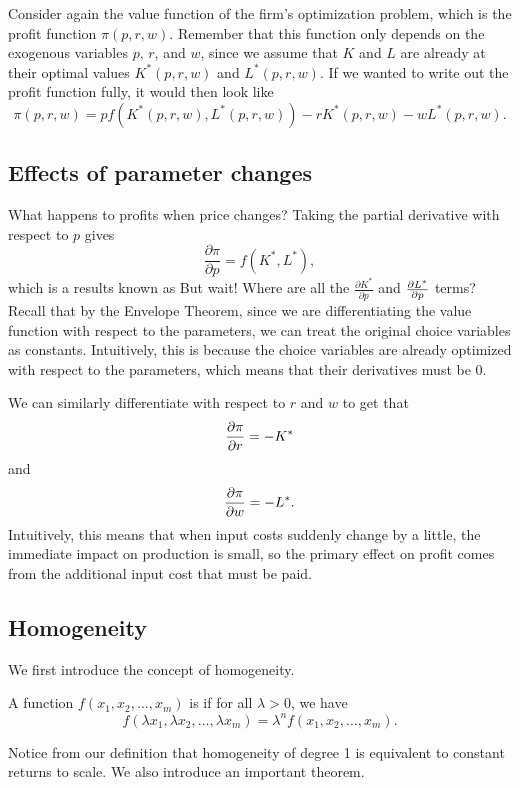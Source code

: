 Consider again the value function of the firm's optimization problem, which is the profit function $\pi(p, r, w)$. Remember that this function only depends on the exogenous variables $p$, $r$, and $w$, since we assume that $K$ and $L$ are already at their optimal values $K^*(p, r, w)$ and $L^*(p, r, w)$. If we wanted to write out the profit function fully, it would then look like
$$\pi(p, r, w) = pf(K^*(p, r, w), L^*(p, r, w)) - rK^*(p, r, w) - wL^*(p, r, w).$$

\subsection*{Effects of parameter changes}

What happens to profits when price changes? Taking the partial derivative with respect to $p$ gives
$$\frac{\partial \pi}{\partial p} = f(K^*, L^*),$$
which is a results known as  But wait! Where are all the $\frac{\partial K^*}{\partial p}$ and $\pdv{L^*}{p}$ terms? Recall that by the Envelope Theorem, since we are differentiating the value function with respect to the parameters, we can treat the original choice variables as constants. Intuitively, this is because the choice variables are already optimized with respect to the parameters, which means that their derivatives must be 0. 

We can similarly differentiate with respect to $r$ and $w$ to get that 
$$\pdv{\pi}{r} = -K^*$$
and
$$\pdv{\pi}{w} = -L^*.$$
Intuitively, this means that when input costs suddenly change by a little, the immediate impact on production is small, so the primary effect on profit comes from the additional input cost that must be paid.

\subsection*{Homogeneity}
We first introduce the concept of homogeneity.
\begin{definition}
A function $f(x_1, x_2, \ldots, x_m)$ is  if for all $\lambda > 0$, we have 
$$f\left(\lambda x_{1}, \lambda x_{2}, \ldots, \lambda x_{m}\right)=\lambda^{n} f\left(x_{1}, x_{2}, \ldots, x_{m}\right).$$
\end{definition}
Notice from our definition that homogeneity of degree 1 is equivalent to constant returns to scale. We also introduce an important theorem.

